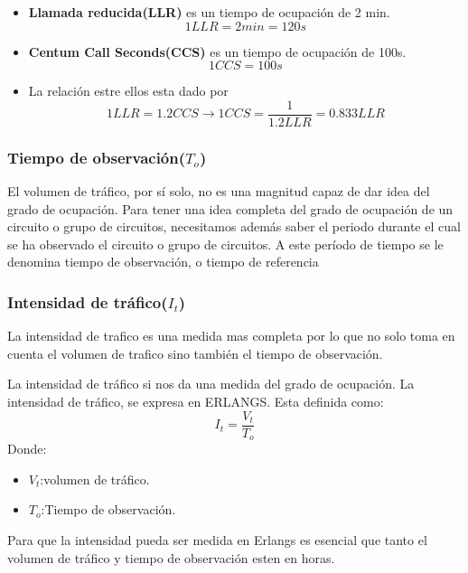 \documentclass[
	12pt, %
	fleqn, %
	a4paper, %
	oneside, %
]{LegrandOrangeBook}
\begin{document}
\begin{itemize}
\item \textbf{Llamada reducida(LLR)} es un tiempo de ocupación de 2 min.
\begin{displaymath}
1 LLR=2 min=120s
\end{displaymath}
\item \textbf{Centum Call Seconds(CCS)} es un tiempo de ocupación de 100s.
\begin{displaymath}
1 CCS=100s
\end{displaymath}
\item La relación estre ellos esta dado por
\begin{displaymath}
1LLR=1.2CCS \rightarrow 1CCS=\frac{1}{1.2LLR}=0.833LLR
\end{displaymath}
\end{itemize}
\subsubsection{Tiempo de observación($T_o$)}
El volumen de tráfico, por sí solo, no es una magnitud capaz de dar idea del grado de ocupación. Para tener una idea completa del grado de ocupación de un circuito o grupo de circuitos, necesitamos además saber el periodo durante el cual se ha observado el circuito o grupo de circuitos. A este período de tiempo se le denomina tiempo de observación, o tiempo de referencia
\subsubsection{Intensidad de tráfico($I_t$)}
La intensidad de trafico es una medida mas completa por lo que no solo toma en cuenta el volumen de trafico sino también el  tiempo de observación.
\begin{definition}
La intensidad de tráfico si nos da una medida del grado de ocupación.
La intensidad de tráfico, se expresa en ERLANGS. Esta definida como:
\begin{equation}\label{eq:intensidad trafico}
I_t=\frac{V_t}{T_o}
\end{equation}
Donde:
\begin{itemize}
\item $V_t$:volumen de tráfico.
\item $T_o$:Tiempo de observación.
\end{itemize}
\begin{remark}
Para que la intensidad pueda ser medida en Erlangs es esencial que tanto el volumen de tráfico y tiempo de observación esten en horas.
\end{remark}
\end{definition}
\end{document}
